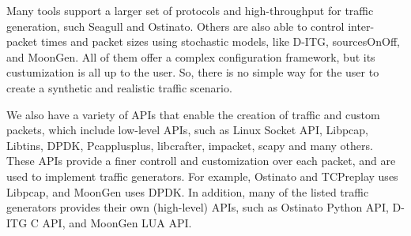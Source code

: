 Many tools support a larger set of protocols and high-throughput for traffic generation, such Seagull and Ostinato. Others are also able to control inter-packet times and packet sizes using stochastic models, like D-ITG\cite{ditg-paper}, sourcesOnOff\cite{sourcesonoff-paper}, and MoonGen. All of them offer a complex configuration framework, but its custumization is all up to the user. So, there is no simple way for the user to create a synthetic and realistic traffic scenario. 

We also have a variety of APIs that enable the creation of traffic and custom packets, which include low-level APIs, such as Linux Socket API,  Libpcap, Libtins, DPDK, Pcapplusplus, libcrafter, impacket, scapy and many others. These APIs provide a finer controll and customization over each packet, and are used to implement traffic generators. For example, Ostinato and TCPreplay uses Libpcap, and MoonGen uses DPDK. In addition, many of the listed traffic generators provides their own (high-level) APIs, such as Ostinato Python API, D-ITG C API, and MoonGen LUA API. 






